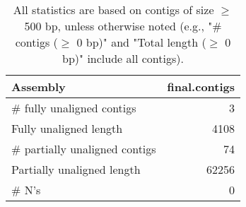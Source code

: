 \documentclass[12pt,a4paper]{article}
\begin{document}
\begin{table}[ht]
\begin{center}
\caption{All statistics are based on contigs of size $\geq$ 500 bp, unless otherwise noted (e.g., "\# contigs ($\geq$ 0 bp)" and "Total length ($\geq$ 0 bp)" include all contigs).}
\begin{tabular}{|l*{1}{|r}|}
\hline
Assembly & final.contigs \\ \hline
\# fully unaligned contigs & 3 \\ \hline
Fully unaligned length & 4108 \\ \hline
\# partially unaligned contigs & 74 \\ \hline
Partially unaligned length & 62256 \\ \hline
\# N's & 0 \\ \hline
\end{tabular}
\end{center}
\end{table}
\end{document}
